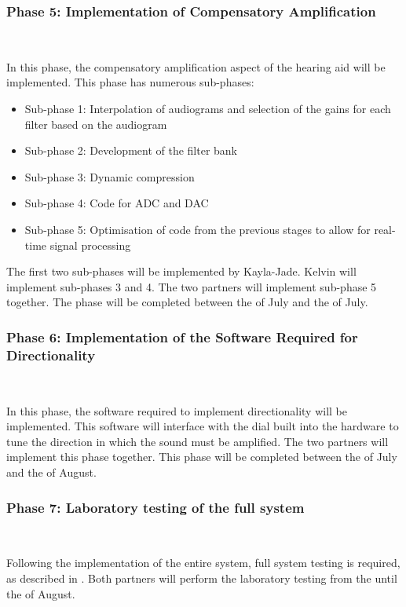\documentclass[10pt,twocolumn]{witseiepaper}
\begin{document}
\subsubsection*{Phase 5: Implementation of Compensatory Amplification} $    $

In this phase, the compensatory amplification aspect of the hearing aid will be implemented. This phase has numerous sub-phases:
\begin{itemize}
	\item Sub-phase 1: Interpolation of audiograms and selection of the gains for each filter based on the audiogram
	\item Sub-phase 2: Development of the filter bank
	\item Sub-phase 3: Dynamic compression
	\item Sub-phase 4: Code for ADC and DAC
	\item Sub-phase 5: Optimisation of code from the previous stages to allow for real-time signal processing
\end{itemize}

The first two sub-phases will be implemented by Kayla-Jade. Kelvin will implement sub-phases 3 and 4. The two partners will implement sub-phase 5 together. The phase will be completed between the  of July and the  of July.


\subsubsection*{Phase 6: Implementation of the Software Required for Directionality} $    $

In this phase, the software required to implement directionality will be implemented. This software will interface with the dial built into the hardware to tune the direction in which the sound must be amplified. The two partners will implement this phase together. This phase will be completed between the  of July and the  of August.

\subsubsection*{Phase 7: Laboratory testing of the full system} $    $

Following the implementation of the entire system, full system testing is required, as described in . Both partners will perform the laboratory testing from the  until the  of August.
\end{document}
